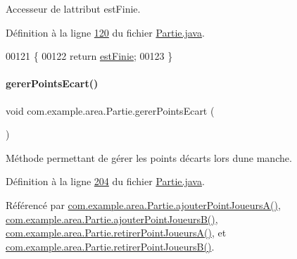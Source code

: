 Accesseur de l\textquotesingle{}attribut est\+Finie. 



Définition à la ligne \hyperlink{_partie_8java_source_l00120}{120} du fichier \hyperlink{_partie_8java_source}{Partie.\+java}.


\begin{DoxyCode}
00121     \{
00122         \textcolor{keywordflow}{return} \hyperlink{classcom_1_1example_1_1area_1_1_partie_ab0dd955a65440cab1569311ff35de3eb}{estFinie};
00123     \}
\end{DoxyCode}
\mbox{\label{classcom_1_1example_1_1area_1_1_partie_a2838da99f206d736a22f8a3f271365b2}} 
\paragraph{\texorpdfstring{gerer\+Points\+Ecart()}{gererPointsEcart()}}
{\footnotesize\ttfamily void com.\+example.\+area.\+Partie.\+gerer\+Points\+Ecart (\begin{DoxyParamCaption}{ }\end{DoxyParamCaption})\hspace{0.3cm}{\ttfamily [private]}}



Méthode permettant de gérer les points d\textquotesingle{}écarts lors d\textquotesingle{}une manche. 



Définition à la ligne \hyperlink{_partie_8java_source_l00204}{204} du fichier \hyperlink{_partie_8java_source}{Partie.\+java}.



Référencé par \hyperlink{_partie_8java_source_l00128}{com.\+example.\+area.\+Partie.\+ajouter\+Point\+Joueurs\+A()}, \hyperlink{_partie_8java_source_l00147}{com.\+example.\+area.\+Partie.\+ajouter\+Point\+Joueurs\+B()}, \hyperlink{_partie_8java_source_l00166}{com.\+example.\+area.\+Partie.\+retirer\+Point\+Joueurs\+A()}, et \hyperlink{_partie_8java_source_l00179}{com.\+example.\+area.\+Partie.\+retirer\+Point\+Joueurs\+B()}.


